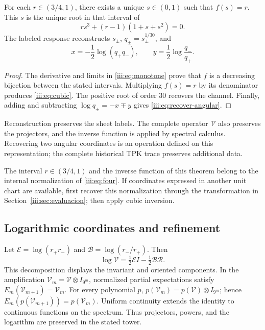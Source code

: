 \begin{theorem}
For each $r\in(3/4,1)$, there exists a unique $s\in(0,1)$ such that $f(s)=r$.
This $s$ is the unique root in that interval of
\begin{equation}
 r s^3+(r-1)(1+s+s^2)=0.
 \label{iii:eq:cubic}
\end{equation}
The labeled response reconstructs $s_\pm$, $q_\pm=s_\pm^{1/30}$, and
\begin{equation}
 x=-\frac12\log(q_+q_-),\qquad
 y=\frac12\log\frac{q_-}{q_+}.
 \label{iii:eq:recover-angular}
\end{equation}
\end{theorem}
\begin{proof}
The derivative and limits in \eqref{iii:eq:monotone} prove that $f$ is a
decreasing bijection between the stated intervals. Multiplying $f(s)=r$
by its denominator produces \eqref{iii:eq:cubic}. The positive root of order
$30$ recovers the channel. Finally, adding and subtracting
$\log q_\pm=-x\mp y$ gives \eqref{iii:eq:recover-angular}.
\end{proof}

Reconstruction preserves the sheet labels. The complete operator
$\mathcal V$ also preserves the projectors, and the inverse function is applied
by spectral calculus. Recovering two angular coordinates is an
operation defined on this representation; the complete historical
TPK trace preserves additional data.

The interval $r\in(3/4,1)$ and the inverse function of this theorem belong
to the internal normalization of \eqref{iii:eq:four}. If coordinates
expressed in another unit chart are available, first recover
this normalization through the transformation in
Section~\ref{iii:sec:evaluacion}; then apply cubic inversion.



\subsection{Logarithmic coordinates and refinement}

Let $\mathcal E=\log(r_+r_-)$ and $\mathcal B=\log(r_-/r_+)$. Then
\begin{equation}
 \log\mathcal V=\tfrac12\mathcal E I-\tfrac12\mathcal B\mathcal R.
 \label{iii:eq:logvac}
\end{equation}
This decomposition displays the invariant and oriented components.
In the amplification $\mathcal V_m=\mathcal V\otimes I_{9^m}$, normalized
partial expectations satisfy
$E_m(\mathcal V_{m+1})=\mathcal V_m$. For every polynomial $p$,
$p(\mathcal V_m)=p(\mathcal V)\otimes I_{9^m}$; hence
$E_m(p(\mathcal V_{m+1}))=p(\mathcal V_m)$. Uniform continuity
extends the identity to continuous functions on the spectrum.
Thus projectors, powers, and the logarithm are preserved in the stated tower.

